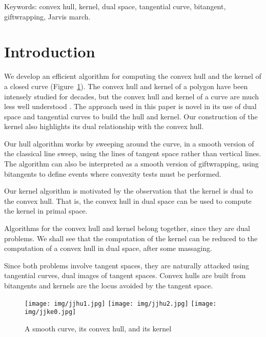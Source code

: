 \documentclass[12pt]{article}
\begin{document}
Keywords: convex hull, kernel, dual space, tangential curve, bitangent,
	  giftwrapping, Jarvis march.

\tableofcontents

\clearpage


\section{Introduction}

We develop an efficient algorithm for computing the convex hull and the
kernel of a closed curve (Figure~\ref{fig:curveob1b}).
The convex hull and kernel of a polygon have been intensely studied
for decades, but the convex hull and kernel of a curve
are much less well understood \cite{kimBajajOnHull,elber01,elber02}.
The approach used in this paper is novel in its use of dual space
and tangential curves \cite{jj01,jj02} to build the hull and kernel.
Our construction of the kernel also highlights its dual relationship
with the convex hull.

Our hull algorithm works by sweeping around the curve,
in a smooth version of the classical 
line sweep, using the lines of tangent space rather than vertical lines.
The algorithm can also be interpreted as a smooth version of
giftwrapping,
using bitangents to define events where convexity tests must be performed.

Our kernel algorithm is motivated by the observation that the kernel
is dual to the convex hull.
That is, the convex hull in dual space can be used to compute the kernel
in primal space.
	
Algorithms for the convex hull and kernel belong together, since they are
dual problems.
We shall see that the computation of the kernel can be reduced
to the computation of a convex hull in dual space,
after some massaging.

Since both problems involve tangent spaces, they are naturally attacked
using tangential curves, dual images of tangent spaces.
Convex hulls are built from bitangents and kernels are the locus
avoided by the tangent space.

\begin{figure}[h]
\begin{center}
\texttt{[image: img/jjhu1.jpg]}
\texttt{[image: img/jjhu2.jpg]}
\texttt{[image: img/jjke0.jpg]}
\end{center}
\caption{A smooth curve, its convex hull, and its kernel}
\label{fig:curveob1b}
\end{figure}
\end{document}
